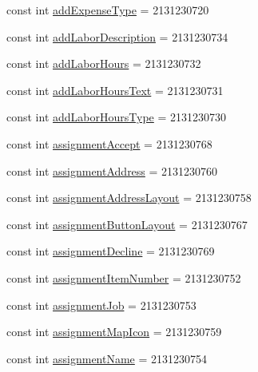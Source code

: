 \begin{DoxyCompactItemize}
\item 
const int \hyperlink{class_field_service_1_1_android_1_1_resource_1_1_id_a23f8422ec7c8c783213440df731977e1}{add\+Expense\+Type} = 2131230720
\item 
const int \hyperlink{class_field_service_1_1_android_1_1_resource_1_1_id_a5720073744c8f13903bd41fad357b013}{add\+Labor\+Description} = 2131230734
\item 
const int \hyperlink{class_field_service_1_1_android_1_1_resource_1_1_id_a130dc03e1a6b5c3c67d887394256cd95}{add\+Labor\+Hours} = 2131230732
\item 
const int \hyperlink{class_field_service_1_1_android_1_1_resource_1_1_id_ab148f1a3cedb93297e775280bb374ba6}{add\+Labor\+Hours\+Text} = 2131230731
\item 
const int \hyperlink{class_field_service_1_1_android_1_1_resource_1_1_id_abe8c5a13b8c9b4254f9c73f9aa826bac}{add\+Labor\+Hours\+Type} = 2131230730
\item 
const int \hyperlink{class_field_service_1_1_android_1_1_resource_1_1_id_a4403b95c41e987d69e4fb6d6638f205a}{assignment\+Accept} = 2131230768
\item 
const int \hyperlink{class_field_service_1_1_android_1_1_resource_1_1_id_a43174f23528303e97e454e563107ba3f}{assignment\+Address} = 2131230760
\item 
const int \hyperlink{class_field_service_1_1_android_1_1_resource_1_1_id_a377ab344e38976d580c08cf50de64d9f}{assignment\+Address\+Layout} = 2131230758
\item 
const int \hyperlink{class_field_service_1_1_android_1_1_resource_1_1_id_ae67591b65a3bca482606414a4be9add6}{assignment\+Button\+Layout} = 2131230767
\item 
const int \hyperlink{class_field_service_1_1_android_1_1_resource_1_1_id_a396398da9ece86581430cd7e2ce6f1b1}{assignment\+Decline} = 2131230769
\item 
const int \hyperlink{class_field_service_1_1_android_1_1_resource_1_1_id_a0dcd053892cc733c7464b57b477ade1a}{assignment\+Item\+Number} = 2131230752
\item 
const int \hyperlink{class_field_service_1_1_android_1_1_resource_1_1_id_a10b81905250161c738107e05b1579038}{assignment\+Job} = 2131230753
\item 
const int \hyperlink{class_field_service_1_1_android_1_1_resource_1_1_id_a725559bc4778949097a2db902eed4bf1}{assignment\+Map\+Icon} = 2131230759
\item 
const int \hyperlink{class_field_service_1_1_android_1_1_resource_1_1_id_aa9544e0e16d58acd55f71b2d4b96246a}{assignment\+Name} = 2131230754

\end{DoxyCompactItemize}
